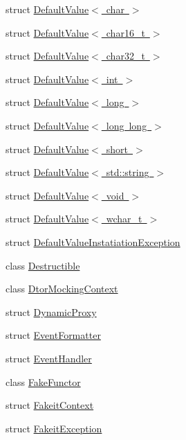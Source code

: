 \begin{DoxyCompactItemize}
\item 
struct \mbox{\hyperlink{structfakeit_1_1DefaultValue_3_01char_01_4}{Default\+Value$<$ char $>$}}
\item 
struct \mbox{\hyperlink{structfakeit_1_1DefaultValue_3_01char16__t_01_4}{Default\+Value$<$ char16\+\_\+t $>$}}
\item 
struct \mbox{\hyperlink{structfakeit_1_1DefaultValue_3_01char32__t_01_4}{Default\+Value$<$ char32\+\_\+t $>$}}
\item 
struct \mbox{\hyperlink{structfakeit_1_1DefaultValue_3_01int_01_4}{Default\+Value$<$ int $>$}}
\item 
struct \mbox{\hyperlink{structfakeit_1_1DefaultValue_3_01long_01_4}{Default\+Value$<$ long $>$}}
\item 
struct \mbox{\hyperlink{structfakeit_1_1DefaultValue_3_01long_01long_01_4}{Default\+Value$<$ long long $>$}}
\item 
struct \mbox{\hyperlink{structfakeit_1_1DefaultValue_3_01short_01_4}{Default\+Value$<$ short $>$}}
\item 
struct \mbox{\hyperlink{structfakeit_1_1DefaultValue_3_01std_1_1string_01_4}{Default\+Value$<$ std\+::string $>$}}
\item 
struct \mbox{\hyperlink{structfakeit_1_1DefaultValue_3_01void_01_4}{Default\+Value$<$ void $>$}}
\item 
struct \mbox{\hyperlink{structfakeit_1_1DefaultValue_3_01wchar__t_01_4}{Default\+Value$<$ wchar\+\_\+t $>$}}
\item 
struct \mbox{\hyperlink{structfakeit_1_1DefaultValueInstatiationException}{Default\+Value\+Instatiation\+Exception}}
\item 
class \mbox{\hyperlink{classfakeit_1_1Destructible}{Destructible}}
\item 
class \mbox{\hyperlink{classfakeit_1_1DtorMockingContext}{Dtor\+Mocking\+Context}}
\item 
struct \mbox{\hyperlink{structfakeit_1_1DynamicProxy}{Dynamic\+Proxy}}
\item 
struct \mbox{\hyperlink{structfakeit_1_1EventFormatter}{Event\+Formatter}}
\item 
struct \mbox{\hyperlink{structfakeit_1_1EventHandler}{Event\+Handler}}
\item 
class \mbox{\hyperlink{classfakeit_1_1FakeFunctor}{Fake\+Functor}}
\item 
struct \mbox{\hyperlink{structfakeit_1_1FakeitContext}{Fakeit\+Context}}
\item 
struct \mbox{\hyperlink{structfakeit_1_1FakeitException}{Fakeit\+Exception}}

\end{DoxyCompactItemize}
